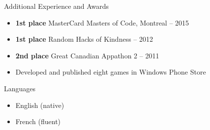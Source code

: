 \documentclass[]{cv}
\begin{document}
	\begin{cvsection}{Additional Experience and Awards}
		\begin{cvsubsection}{}{}{}
			\begin{itemize}
				\item \textbf{1st place} MasterCard Masters of Code, Montreal -- 2015
				\item \textbf{1st place} Random Hacks of Kindness -- 2012
				\item \textbf{2nd place} Great Canadian Appathon 2 -- 2011
				\item Developed and published eight games in Windows Phone Store
			\end{itemize}
		\end{cvsubsection}
	\end{cvsection}

	\begin{cvsection}{Languages}
		\begin{cvsubsection}{}{}{}
			\begin{itemize}
				\item English (native)
				\item French (fluent)
			\end{itemize}
		\end{cvsubsection}
	\end{cvsection}
\end{document}
